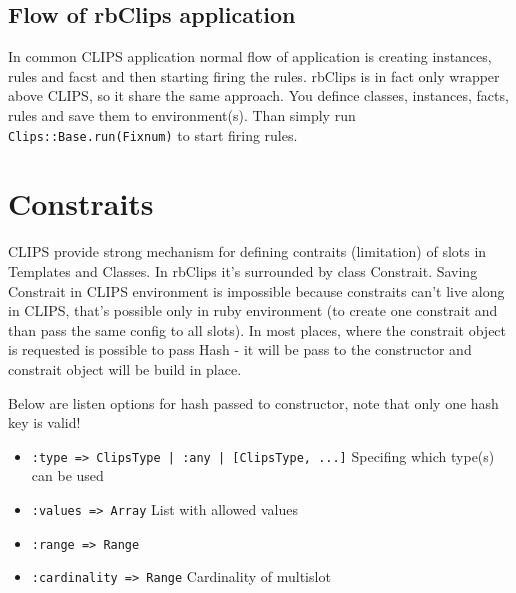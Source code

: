 \documentclass[a4paper,10pt]{article}
\begin{document}
\subsection{Flow of rbClips application}
In common CLIPS application normal flow of application is creating instances, rules and facst and then starting firing the rules. rbClips is in fact only wrapper above CLIPS, so it share the same approach. You defince classes, instances, facts, rules and save them to environment(s). Than simply run \texttt{Clips::Base.run(Fixnum)} to start firing rules.

\section{Constraits}
CLIPS provide strong mechanism for defining contraits (limitation) of slots in Templates and Classes. In rbClips it's surrounded by class Constrait. Saving Constrait in CLIPS environment is impossible because constraits can't live along in CLIPS, that's possible only in ruby environment (to create one constrait and than pass the same config to all slots). In most places, where the constrait object is requested is possible to pass Hash - it will be pass to the constructor and constrait object will be build in place.

Below are listen options for hash passed to constructor, note that only one hash key is valid!
\begin{itemize}
 \item \texttt{:type => ClipsType | :any | [ClipsType, ...]} Specifing which type(s) can be used
 \item \texttt{:values => Array} List with allowed values
 \item \texttt{:range => Range}
 \item \texttt{:cardinality => Range} Cardinality of multislot
\end{itemize}

\end{document}

